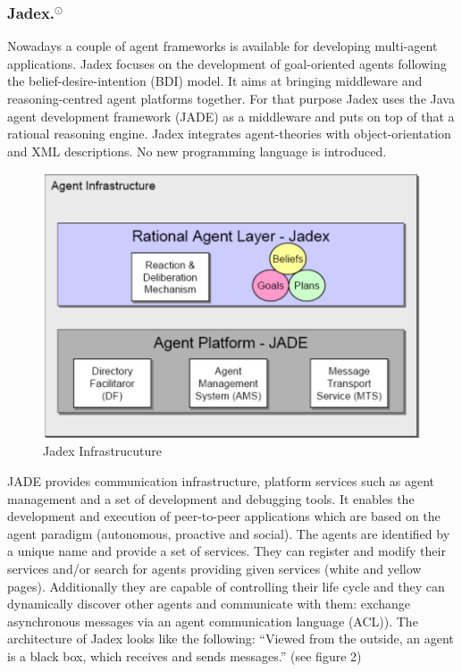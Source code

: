 \subsubsection[Jadex.]{Jadex.$^\odot$}\label{fun:apl_jadex}
Nowadays a couple of agent frameworks is available for developing multi-agent applications. \cite{Mangina} Jadex focuses on the development of goal-oriented agents following the belief-desire-intention (BDI) model. It aims at bringing middleware and reasoning-centred agent platforms together. For that purpose Jadex uses the Java agent development framework (JADE) as a middleware and puts on top of that a rational reasoning engine. Jadex integrates agent-theories with object-orientation and XML descriptions. No new programming language is introduced.
\begin{figure}
	\centering
	\includegraphics{images/Jadex_infrastructure.png}
	\caption{Jadex Infrastrucuture}
	\label{fig1}
\end{figure}
JADE provides communication infrastructure, platform services such as agent management and a set of development and debugging tools. It enables the development and execution of  peer-to-peer applications which are based on the agent paradigm (autonomous, proactive and social). The agents are identified by a unique name and provide a set of services. They can register and modify their services and/or search for agents providing given services (white and yellow pages). Additionally they are capable of controlling their life cycle and they can dynamically discover other agents and communicate with them: exchange asynchronous messages via an agent communication language (ACL)).
The architecture of Jadex looks like the following: "`Viewed from the outside, an agent is a black box, which receives and sends messages."' \cite{Pokahr} (see figure 2)
